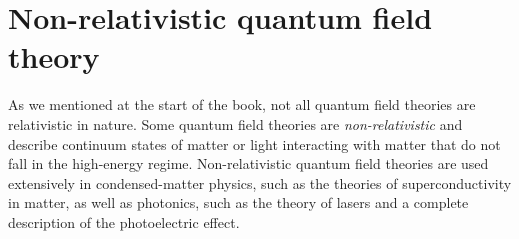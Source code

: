 \chapter{Non-relativistic quantum field theory}

As we mentioned at the start of the book, not all quantum field theories are relativistic in nature. Some quantum field theories are \emph{non-relativistic} and describe continuum states of matter or light interacting with matter that do not fall in the high-energy regime. Non-relativistic quantum field theories are used extensively in condensed-matter physics, such as the theories of superconductivity in matter, as well as photonics, such as the theory of lasers and a complete description of the photoelectric effect.